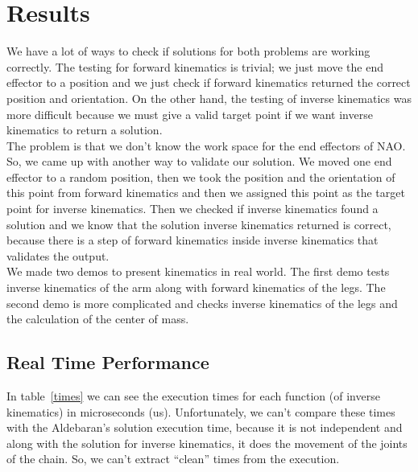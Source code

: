 \chapter{Results}
\label{Results}
We have a lot of ways to check if solutions for both problems are working correctly. The testing for forward kinematics is trivial; we just move the end effector to a position and we just check if forward kinematics returned the correct position and orientation. On the other hand, the testing of inverse kinematics was more difficult because we must give a valid target point if we want inverse kinematics to return a solution.\\
The problem is that we don't know the work space for the end effectors of NAO. So, we came up with another way to validate our solution. We moved one end effector to a random position, then we took the position and the orientation of this point from forward kinematics and then we assigned this point as the target point for inverse kinematics. Then we checked if inverse kinematics found a solution and we know that the solution inverse kinematics returned is correct, because there is a step of forward kinematics inside inverse kinematics that validates the output.\\
We made two demos to present kinematics in real world. The first demo tests inverse kinematics of the arm along with forward kinematics of the legs. The second demo is more complicated and checks inverse kinematics of the legs and the calculation of the center of mass.\\

\section{Real Time Performance}
In table~\ref{times} we can see the execution times for each function (of inverse kinematics) in microseconds (us). Unfortunately, we can't compare these times with the Aldebaran's solution execution time, because it is not independent and along with the solution for inverse kinematics, it does the movement of the joints of the chain. So, we can't extract ``clean'' times from the execution.\\

